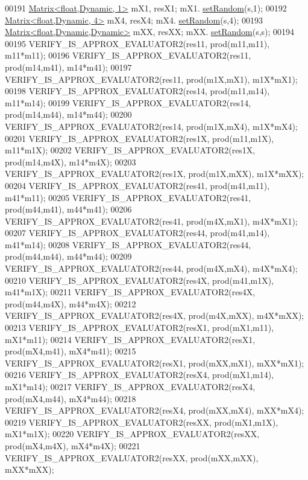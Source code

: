 \begin{DoxyCode}
00191     \hyperlink{group___core___module_class_eigen_1_1_matrix}{Matrix<float,Dynamic,      1>} mX1, resX1;  mX1.
      \hyperlink{class_eigen_1_1_plain_object_base_af0e576a0e1aefc9ee346de44cc352ba3}{setRandom}(s,1);
00192     \hyperlink{group___core___module_class_eigen_1_1_matrix}{Matrix<float,Dynamic,      4>} mX4, resX4;  mX4.
      \hyperlink{class_eigen_1_1_plain_object_base_af0e576a0e1aefc9ee346de44cc352ba3}{setRandom}(s,4);
00193     \hyperlink{group___core___module_class_eigen_1_1_matrix}{Matrix<float,Dynamic,Dynamic>} mXX, resXX;  mXX.
      \hyperlink{class_eigen_1_1_plain_object_base_af0e576a0e1aefc9ee346de44cc352ba3}{setRandom}(s,s);
00194 
00195     VERIFY\_IS\_APPROX\_EVALUATOR2(res11, prod(m11,m11), m11*m11);
00196     VERIFY\_IS\_APPROX\_EVALUATOR2(res11, prod(m14,m41), m14*m41);
00197     VERIFY\_IS\_APPROX\_EVALUATOR2(res11, prod(m1X,mX1), m1X*mX1);
00198     VERIFY\_IS\_APPROX\_EVALUATOR2(res14, prod(m11,m14), m11*m14);
00199     VERIFY\_IS\_APPROX\_EVALUATOR2(res14, prod(m14,m44), m14*m44);
00200     VERIFY\_IS\_APPROX\_EVALUATOR2(res14, prod(m1X,mX4), m1X*mX4);
00201     VERIFY\_IS\_APPROX\_EVALUATOR2(res1X, prod(m11,m1X), m11*m1X);
00202     VERIFY\_IS\_APPROX\_EVALUATOR2(res1X, prod(m14,m4X), m14*m4X);
00203     VERIFY\_IS\_APPROX\_EVALUATOR2(res1X, prod(m1X,mXX), m1X*mXX);
00204     VERIFY\_IS\_APPROX\_EVALUATOR2(res41, prod(m41,m11), m41*m11);
00205     VERIFY\_IS\_APPROX\_EVALUATOR2(res41, prod(m44,m41), m44*m41);
00206     VERIFY\_IS\_APPROX\_EVALUATOR2(res41, prod(m4X,mX1), m4X*mX1);
00207     VERIFY\_IS\_APPROX\_EVALUATOR2(res44, prod(m41,m14), m41*m14);
00208     VERIFY\_IS\_APPROX\_EVALUATOR2(res44, prod(m44,m44), m44*m44);
00209     VERIFY\_IS\_APPROX\_EVALUATOR2(res44, prod(m4X,mX4), m4X*mX4);
00210     VERIFY\_IS\_APPROX\_EVALUATOR2(res4X, prod(m41,m1X), m41*m1X);
00211     VERIFY\_IS\_APPROX\_EVALUATOR2(res4X, prod(m44,m4X), m44*m4X);
00212     VERIFY\_IS\_APPROX\_EVALUATOR2(res4X, prod(m4X,mXX), m4X*mXX);
00213     VERIFY\_IS\_APPROX\_EVALUATOR2(resX1, prod(mX1,m11), mX1*m11);
00214     VERIFY\_IS\_APPROX\_EVALUATOR2(resX1, prod(mX4,m41), mX4*m41);
00215     VERIFY\_IS\_APPROX\_EVALUATOR2(resX1, prod(mXX,mX1), mXX*mX1);
00216     VERIFY\_IS\_APPROX\_EVALUATOR2(resX4, prod(mX1,m14), mX1*m14);
00217     VERIFY\_IS\_APPROX\_EVALUATOR2(resX4, prod(mX4,m44), mX4*m44);
00218     VERIFY\_IS\_APPROX\_EVALUATOR2(resX4, prod(mXX,mX4), mXX*mX4);
00219     VERIFY\_IS\_APPROX\_EVALUATOR2(resXX, prod(mX1,m1X), mX1*m1X);
00220     VERIFY\_IS\_APPROX\_EVALUATOR2(resXX, prod(mX4,m4X), mX4*m4X);
00221     VERIFY\_IS\_APPROX\_EVALUATOR2(resXX, prod(mXX,mXX), mXX*mXX);

\end{DoxyCode}
